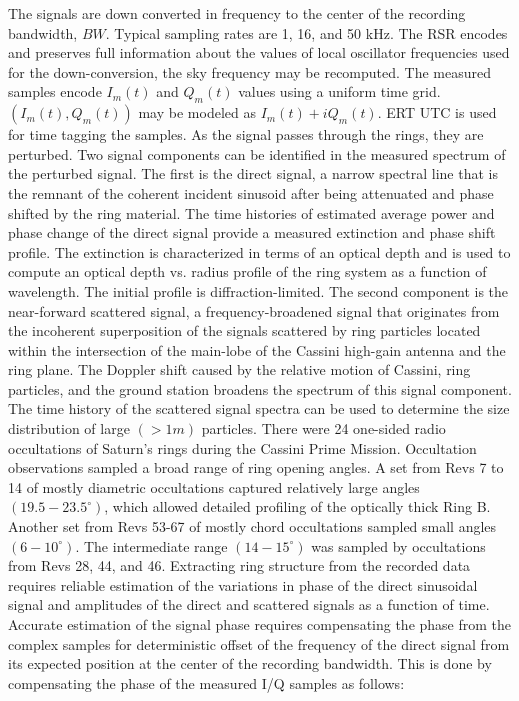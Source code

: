 \documentclass{article}
\theoremstyle{mystyle}
\begin{document}
The signals are down converted in frequency to the center of the recording bandwidth, $BW$. Typical sampling rates are 1, 16, and 50 kHz. The RSR encodes and preserves full information about the values of local oscillator frequencies used for the down-conversion, the sky frequency may be recomputed. The measured samples encode $I_{m}(t)$ and $Q_{m}(t)$ values using a uniform time grid. $(I_{m}(t),Q_{m}(t))$ may be modeled as $I_{m}(t)+iQ_{m}(t)$. ERT UTC is used for time tagging the samples. As the signal passes through the rings, they are perturbed. Two signal components can be identified in the measured spectrum of the perturbed signal. The first is the direct signal, a narrow spectral line that is the remnant of the coherent incident sinusoid after being attenuated and phase shifted by the ring material. The time histories of estimated average power and phase change of the direct signal provide a measured extinction and phase shift profile. The extinction is characterized in terms of an optical depth and is used to compute an optical depth vs. radius profile of the ring system as a function of wavelength. The initial profile is diffraction-limited. The second component is the near-forward scattered signal, a frequency-broadened signal that originates from the incoherent superposition of the signals scattered by ring particles located within the intersection of the main-lobe of the Cassini high-gain antenna and the ring plane. The Doppler shift caused by the relative motion of Cassini, ring particles, and the ground station broadens the spectrum of this signal component. The time history of the scattered signal spectra can be used to determine the size distribution of large $(>1m)$ particles. There were 24 one-sided radio occultations of Saturn's rings during the Cassini Prime Mission. Occultation observations sampled a broad range of ring opening angles. A set from Revs 7 to 14 of mostly diametric occultations captured relatively large angles $(19.5-23.5^{\circ})$, which allowed detailed profiling of the optically thick Ring B. Another set from Revs 53-67 of mostly chord occultations sampled small angles $(6-10^{\circ})$. The intermediate range $(14-15^{\circ})$ was sampled by occultations from Revs 28, 44, and 46. Extracting ring structure from the recorded data requires reliable estimation of the variations in phase of the direct sinusoidal signal and amplitudes of the direct and scattered signals as a function of time. Accurate estimation of the signal phase requires compensating the phase from the complex samples for deterministic offset of the frequency of the direct signal from its expected position at the center of the recording bandwidth. This is done by compensating the phase of the measured I/Q samples as follows:
\end{document}
